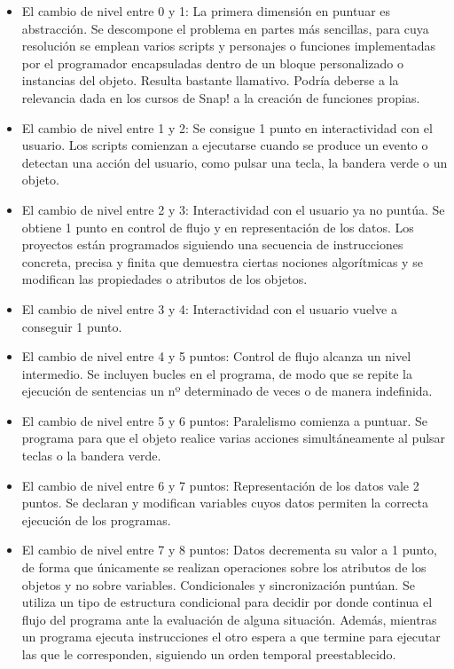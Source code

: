 \documentclass[a4paper, 12pt]{book}
\begin{document}
\begin{itemize}
 \item El cambio de nivel entre 0 y 1:  La primera dimensión en puntuar es abstracción. Se descompone el problema en partes más sencillas, para cuya resolución se emplean varios scripts y personajes o funciones implementadas por el programador encapsuladas dentro de un bloque personalizado o instancias del objeto. Resulta bastante llamativo. Podría deberse a la relevancia dada en los cursos de Snap! a la creación de funciones propias.
 \item El cambio de nivel entre 1 y 2: Se consigue 1 punto en interactividad con el usuario. Los scripts comienzan a ejecutarse cuando se produce un evento o detectan una acción del usuario, como pulsar una tecla, la bandera verde o un objeto.
 \item El cambio de nivel entre 2 y 3: Interactividad con el usuario ya no puntúa. Se obtiene 1 punto en control de flujo y en representación de los datos. Los proyectos están programados siguiendo una secuencia de instrucciones concreta, precisa y finita que demuestra ciertas nociones algorítmicas y se modifican las propiedades o atributos de los objetos.
 \item El cambio de nivel entre 3 y 4: Interactividad con el usuario vuelve a conseguir 1 punto.
 \item El cambio de nivel entre 4 y 5 puntos: Control de flujo alcanza un nivel intermedio. Se incluyen bucles en el programa, de modo que se repite la ejecución de sentencias un nº determinado de veces o de manera indefinida. %
 \item El cambio de nivel entre 5 y 6 puntos: Paralelismo comienza a puntuar. Se programa para que el objeto realice varias acciones simultáneamente al pulsar teclas o la bandera verde.
 \item El cambio de nivel entre 6 y 7 puntos: Representación de los datos vale 2 puntos. Se declaran y modifican variables cuyos datos permiten la correcta ejecución de los programas.
 \item El cambio de nivel entre 7 y 8 puntos: Datos decrementa su valor a 1 punto, de forma que únicamente se realizan operaciones sobre los atributos de los objetos y no sobre variables. Condicionales y sincronización puntúan. Se utiliza un tipo de estructura condicional para decidir por donde continua el flujo del programa ante la evaluación de alguna situación. Además, mientras un programa ejecuta instrucciones el otro espera a que termine para ejecutar las que le corresponden, siguiendo un orden temporal preestablecido.

\end{itemize}
\end{document}

